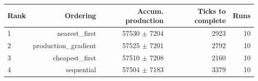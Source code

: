 \begin{tabular}{lrrrr}
\toprule
Rank & Ordering & Accum. production & Ticks to complete & Runs \\
\midrule
1 & nearest\_first & 57530 $\pm$ 7204 & 2923 & 10 \\
2 & production\_gradient & 57525 $\pm$ 7201 & 2792 & 10 \\
3 & cheapest\_first & 57510 $\pm$ 7208 & 2160 & 10 \\
4 & sequential & 57504 $\pm$ 7183 & 3379 & 10 \\
\bottomrule
\end{tabular}
